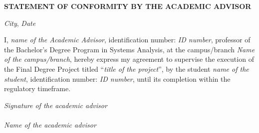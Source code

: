 \centering\textbf{STATEMENT OF CONFORMITY BY THE ACADEMIC ADVISOR}

\vspace{1cm}
\begin{flushright}
	\textit{City}, \textit{Date}
\end{flushright}
\vspace{1cm}

\begin{flushleft}
	\hspace{1cm} I, \textit{name of the Academic Advisor}, identification number: \textit{ID number}, professor of the Bachelor's Degree Program in Systems Analysis, at the campus/branch \textit{Name of the campus/branch}, hereby express my agreement to supervise the execution of the Final Degree Project titled ``\textit{title of the project}'', by the student \textit{name of the student}, identification number: \textit{ID number}, until its completion within the regulatory timeframe.
\end{flushleft}
\vspace{2cm}

\begin{center}
	\textit{Signature of the academic advisor} \\
	\vspace{0.5cm}
	\underline{\hspace{7cm}} \\
	\textit{Name of the academic advisor}
\end{center}
\vspace{1cm}
